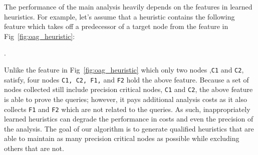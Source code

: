 \begin{comment}
The performance of a learned heuristic is heavily depends on features it contains.
For example, let's consider a heuristic contains the following feature which takes
off a node from the feature in Fig~\ref{fig:oag_heuristic}:
\begin{center}
\resizebox{0.4\columnwidth}{!}{
	\begin{tikzpicture}
	\node [block3,fill = gray] (n2) {{\tt\Large [0,$\infty$],[0,$\infty$]}};
	\node [block3,right = 0.8cm of n2] (n3) {{\tt\Large [2,$\infty$],[0,$\infty$]}};
	\path [line] (n2) -> (n3);
	\end{tikzpicture}
	}.
\end{center}
From the OAG in Fig~\ref{fig:oag},
Unlike the feature in Fig~\ref{fig:oag_heuristic}, the above feature selects four nodes {\tt C1, C2, F1,} and {\tt F2} from OAG.
Although all the precision critical nodes (e.g., {\tt C1} and {\tt C2}) belong to the feature, it additionally includes {\tt F1} and {\tt F2} which are not related to the queries.
It proves all the queries but pays additional analysis cost than the analysis with the heuristic Fig~\ref{fig:oag_heuristic}
because the method {\tt foo} is separated into two different contexts {\tt foo[F1]} and {\tt foo[F2]}.
The goal of our algorithm is to generate qualified features
that include precision critical nodes while exclude others as much as possible.
\end{comment}
The performance of the main analysis heavily depends on the features in learned heuristics.
For example, let's assume that a heuristic contains the following feature which takes
off a predecessor of a target node from the feature in Fig~\ref{fig:oag_heuristic}:
\begin{center}
.
\end{center}
Unlike the feature in Fig~\ref{fig:oag_heuristic} which only two nodes ,{\tt C1} and {\tt C2}, satisfy, 
four nodes {\tt C1, C2, F1,} and {\tt F2} hold the above feature.
Because a set of nodes collected still include precision critical nodes, {\tt C1} and {\tt C2}, the above feature is able to prove the queries; 
however, it pays additional analysis costs as it also collects {\tt F1} and {\tt F2} which are not related to the queries.
As such, inappropriately learned heuristics can degrade the performance in costs and even the precision 
of the analysis.
The goal of our algorithm is to generate qualified heuristics that are able to maintain as many precision critical nodes as possible while excluding others that are not.






